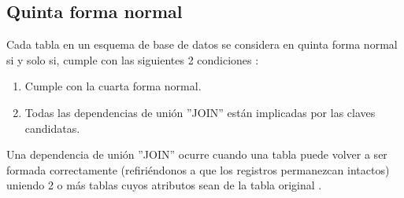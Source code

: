  
    
\subsection*{Quinta forma normal}

    Cada tabla en un esquema de base de datos se considera en quinta forma normal si y solo si, cumple con las siguientes 2 condiciones \cite[pág. 124]{libroBaseDeDatosInglesCuarteEnAdelante}:
    
    \begin{enumerate}
        \item Cumple con la cuarta forma normal.
        \item Todas las dependencias de unión ''JOIN'' están implicadas por las claves candidatas.
    \end{enumerate}
    
    \noindent Una dependencia de unión ''JOIN'' ocurre cuando una tabla puede volver a ser formada correctamente (refiriéndonos a que los registros permanezcan intactos) uniendo 2 o más tablas cuyos atributos sean de la tabla original \cite[pág. 124]{libroBaseDeDatosInglesCuarteEnAdelante}.\\
    
